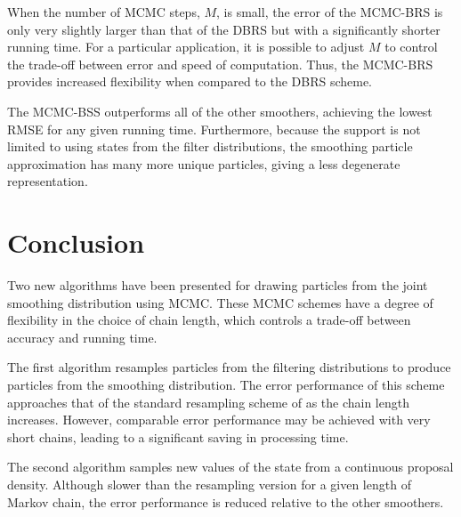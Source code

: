 \documentclass[10pt,twocolumn,twoside]{IEEEtran}
\begin{document}
When the number of MCMC steps, $M$, is small, the error of the MCMC-BRS is only very slightly larger than that of the DBRS but with a significantly shorter running time. For a particular application, it is possible to adjust $M$ to control the trade-off between error and speed of computation. Thus, the MCMC-BRS provides increased flexibility when compared to the DBRS scheme.

The MCMC-BSS outperforms all of the other smoothers, achieving the lowest RMSE for any given running time. Furthermore, because the support is not limited to using states from the filter distributions, the smoothing particle approximation has many more unique particles, giving a less degenerate representation.



\section{Conclusion} \label{sec:conclusions}
Two new algorithms have been presented for drawing particles from the joint smoothing distribution using MCMC. These MCMC schemes have a degree of flexibility in the choice of chain length, which controls a trade-off between accuracy and running time.

The first algorithm resamples particles from the filtering distributions to produce particles from the smoothing distribution. The error performance of this scheme approaches that of the standard resampling scheme of \cite{Godsill2004} as the chain length increases. However, comparable error performance may be achieved with very short chains, leading to a significant saving in processing time.

The second algorithm samples new values of the state from a continuous proposal density. Although slower than the resampling version for a given length of Markov chain, the error performance is reduced relative to the other smoothers.













%
%
\end{document}
